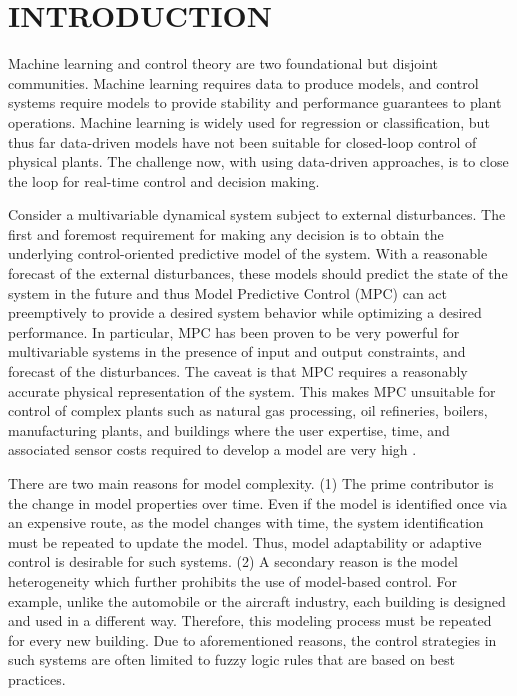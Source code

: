 \section{INTRODUCTION}
\label{S:intro}

Machine learning and control theory are two foundational but disjoint communities. Machine learning requires data to produce models, and control systems require models to provide stability and performance guarantees to plant operations. Machine learning is widely used for regression or classification, but thus far data-driven models have not been suitable for closed-loop control of physical plants. The challenge now, with using data-driven approaches, is to close the loop for real-time control and decision making.

Consider a multivariable dynamical system subject to external disturbances. The first and foremost requirement for making any decision is to obtain the underlying control-oriented predictive model of the system. With a reasonable forecast of the external disturbances, these models should predict the state of the system in the future and thus Model Predictive Control (MPC) can act preemptively to provide a desired system behavior while optimizing a desired performance. In particular, MPC has been proven to be very powerful for multivariable systems in the presence of input and output constraints, and forecast of the disturbances. The caveat is that MPC requires a reasonably accurate physical representation of the system. This makes MPC unsuitable for control of complex plants such as natural gas processing, oil refineries, boilers, manufacturing plants, and buildings where the user expertise, time, and associated sensor costs required to develop a model are very high \cite{Sturzenegger2016,vzavcekova2014}.

There are two main reasons for model complexity. 
(1) The prime contributor is the change in model properties over time. Even if the model is identified once via an expensive route, as the model changes with time, the system identification must be repeated to update the model. Thus, model adaptability or adaptive control is desirable for such systems. 
(2) A secondary reason is the model heterogeneity which further prohibits the use of model-based control. For example, unlike the automobile or the aircraft industry, each building is designed and used in a different way. Therefore, this modeling process must be repeated for every new building. 
Due to aforementioned reasons, the control strategies in such systems are often limited to fuzzy logic rules that are based on best practices. 


